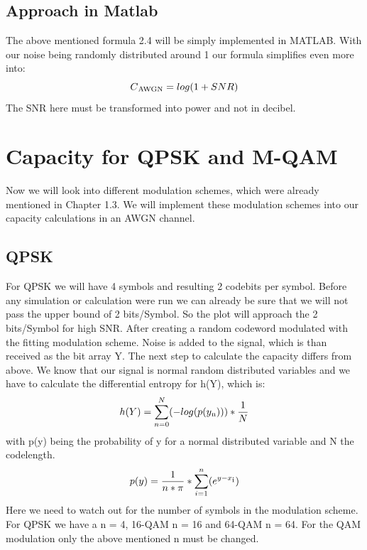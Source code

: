 \documentclass[12pt,oneside, reqno]{report}
\begin{document}
\subsection{Approach in Matlab}
The above mentioned formula 2.4 will be simply implemented in MATLAB. With our noise being randomly distributed around 1 our formula simplifies even more into:
\begin{equation}
\label{metric}
C\textsubscript{AWGN} = log(1+SNR) 
\end{equation} 
The SNR here must be transformed into power and not in decibel.

\section{Capacity for QPSK and M-QAM}
Now we will look into different modulation schemes, which were already mentioned in Chapter 1.3. We will implement these modulation schemes into our capacity calculations in an AWGN channel.
\subsection{QPSK}
For QPSK we will have 4 symbols and resulting 2 codebits per symbol. Before any simulation or calculation were run we can already be sure that we will not pass the upper bound of 2 bits/Symbol. So the plot will approach the 2 bits/Symbol for high SNR.
After creating a random codeword modulated with the fitting modulation scheme. Noise is added to the signal, which is than received as the bit array Y. The next step to calculate the capacity differs from above. 
\newline
We know that our signal is normal random distributed variables and we have to calculate the differential entropy for h(Y), which is:
\begin{equation}
\label{metric}
h(Y) =  \sum_{n=0}^N(-log(p(y\textsubscript{n}))) * \frac{1}{N}
\end{equation} 
with p(y) being the probability of y for a normal distributed variable and N the codelength.
\begin{equation}
\label{metric}
p(y) = \frac{1}{n*\pi}*\sum_{i=1}^n(e^{y-x\textsubscript{i}})
\end{equation} 
Here we need to watch out for the number of symbols in the modulation scheme. For QPSK we have a n = 4, 16-QAM n = 16 and 64-QAM n = 64.
\newline
For the QAM modulation only the above mentioned n must be changed.
 
\end{document}
